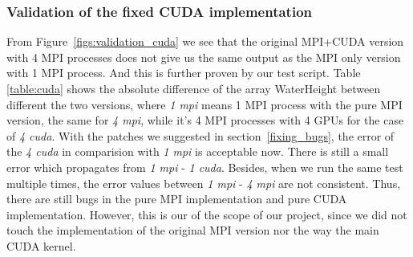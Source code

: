 \documentclass[article]{scrartcl}
\begin{document}
\subsubsection{Validation of the fixed CUDA implementation}
From Figure~\ref{figs:validation_cuda} we see that the original MPI+CUDA version with 4 MPI processes does not give us the same output as the MPI only version with 1 MPI process. And this is further proven by our test script. Table \ref{table:cuda} shows the absolute difference of the array WaterHeight between different the two versions, where \textit{1 mpi} means 1 MPI process with the pure MPI version, the same for \textit{4 mpi}, while it's 4 MPI processes with 4 GPUs for the case of \textit{4 cuda}. With the patches we suggested in section~\ref{fixing_bugs}, the error of the \textit{4 cuda} in comparision with \textit{1 mpi} is acceptable now. There is still a small error which propagates from \textit{1 mpi} - \textit{1 cuda}. Besides, when we run the same test multiple times, the error values between \textit{1 mpi} - \textit{4 mpi} are not consistent. Thus, there are still bugs in the pure MPI implementation and pure CUDA implementation. However, this is our of the scope of our project, since we did not touch the implementation of the original MPI version nor the way the main CUDA kernel. 
\end{document}
